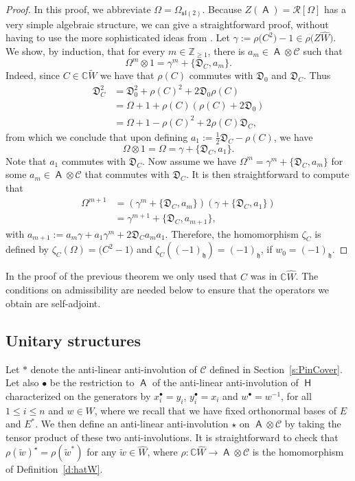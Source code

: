\documentclass[pdftex]{sigma}
\numberwithin{equation}{section}
\newcommand{\fh}{\mathfrak{h}}
\newcommand{\fl}{\mathfrak{l}}
\newcommand{\fs}{\mathfrak{s}}
\newcommand{\bbc}{\mathbb{C}}
\newcommand{\Cc}{\mathcal{C}}
\DeclareMathOperator{\rca}{\mathsf{H}}
\DeclareMathOperator{\ama}{\mathsf{A}}
\begin{document}
\begin{proof}
In this proof, we abbreviate $\Omega = \Omega_{\fs\fl(2)}$.
Because $Z(\ama) = \mathcal{R}[\Omega]$ has a very simple algebraic structure, we can give a straightforward proof, without having to use the more sophisticated ideas from \cite{HP02}. Let $\gamma := \rho\big(C^2\big) - 1\in \rho\big(Z\hat{W}\big)$. We show, by induction, that for every $m\in\mathbb{Z}_{\geq 1}$, there is $a_m \in \ama \otimes \Cc$ such that
\[
\Omega^m\otimes 1 = \gamma^m + \{\mathfrak{D}_C,a_m\}.
\]
Indeed, since $C\in \bbc\tilde W$ we have that $\rho(C)$ commutes with $\mathfrak{D}_0$ and $\mathfrak{D}_C$. Thus
\begin{align*}
 \mathfrak{D}_C^2 &= \mathfrak{D}_0^2 + \rho(C)^2 + 2\mathfrak{D}_0\rho(C)\\
 &= \Omega + 1 + \rho(C)(\rho(C) + 2\mathfrak{D}_0)\\
 &= \Omega + 1 - \rho(C)^2 + 2\rho(C)\mathfrak{D}_C,
\end{align*}
from which we conclude that upon defining $a_1 := \tfrac{1}{2}\mathfrak{D}_C-\rho(C)$, we have
\[
\Omega\otimes 1 = \Omega = \gamma + \{\mathfrak{D}_C,a_1\}.
\]
Note that $a_1$ commutes with $\mathfrak{D}_C$.
Now assume we have $\Omega^m = \gamma^m + \{\mathfrak{D}_C,a_m\}$ for some $a_m\in \ama \otimes \Cc$ that commutes with $\mathfrak{D}_C$. It is then straightforward to compute that
\begin{align*}
 \Omega^{m+1} &= (\gamma^m + \{\mathfrak{D}_C,a_m\})(\gamma + \{\mathfrak{D}_C,a_1\})\\
 &=\gamma^{m+1} + \{\mathfrak{D}_C,a_{m+1}\},
\end{align*}
with $a_{m+1} := a_m\gamma + a_1\gamma^m + 2\mathfrak{D}_Ca_ma_1$. Therefore, the homomorphism $\zeta_C$ is defined by $\zeta_C(\Omega) = \big(C^2 -1\big)$ and $\zeta_C((-1)_\fh) = (-1)_\fh$, if $w_0 = (-1)_\fh$.
\end{proof}

\begin{Remark}
In the proof of the previous theorem we only used that $C$ was in $\bbc\hat{W}$. The conditions on admissibility are needed below to ensure that the operators we obtain are self-adjoint.
\end{Remark}

\subsection{Unitary structures}
Let $\ast$ denote the anti-linear anti-involution of $\Cc$ defined in Section~\ref{s:PinCover}. Let also $\bullet$ be the restriction to $\ama$ of the anti-linear anti-involution of $\rca$ characterized on the generators by $x_i^\bullet = y_i$, $y_i^\bullet = x_i$ and $w^\bullet = w^{-1}$, for all $1\leq i \leq n$ and $w\in W$, where we recall that we have fixed orthonormal bases of $E$ and $E^*$. We then define an anti-linear anti-involution $\star$ on $\ama\otimes\Cc$ by taking the tensor product of these two anti-involutions. It is straightforward to check that $\rho(\tilde{w})^\star = \rho(\tilde{w}^*)$ for any $\tilde{w}\in\hat{W}$, where $\rho\colon \bbc\hat{W}\to\ama\otimes\Cc$ is the homomorphism of Definition~\ref{d:hatW}.
\end{document}
